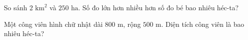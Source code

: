 \begin{ex}
  So sánh $2\text{ km}^2$ và $250\text{ ha}$. Số đo lớn hơn nhiều hơn số đo bé bao nhiêu héc-ta?
\end{ex}

\begin{ex}
  Một công viên hình chữ nhật dài $800\text{ m}$, rộng $500\text{ m}$. Diện tích công viên là bao nhiêu héc-ta?
\end{ex}
